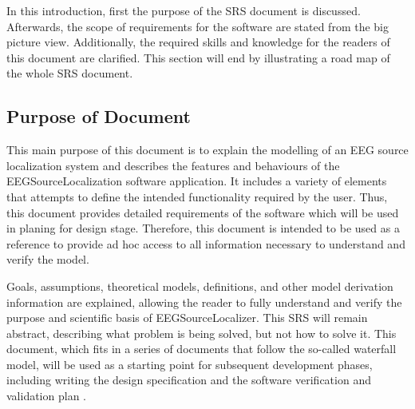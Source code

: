 \documentclass[12pt]{article}
\renewcommand{\progname}{EEGSourceLocalization}
\begin{document}
In this introduction, first the purpose of the SRS document is discussed. Afterwards, the scope of requirements for the software are stated from the big picture view. Additionally, the required skills and knowledge for the readers of this document are clarified. This section will end by illustrating a road map of the whole SRS document.



\subsection{Purpose of Document}
This main purpose of this document is to explain the modelling of an EEG source localization system and describes the features and behaviours of the \progname{}  software application. It includes a variety of elements that attempts to define the intended functionality required by the user. Thus, this document provides detailed requirements of the software which will be used in planing for design stage. Therefore, this document is intended to be used as a reference to provide ad hoc access to all information necessary to understand and verify the model. \

Goals, assumptions, theoretical models, definitions, and other model derivation information are explained, allowing the reader to fully understand and verify the purpose and scientific basis of EEGSourceLocalizer. This SRS will remain abstract, describing what problem is being solved, but not how to solve it. This document, which fits in a series of documents that follow the so-called waterfall model, will be used as a starting point for subsequent development phases, including writing the design specification and the software verification and validation plan \cite{Parnas1978}.

\end{document}
